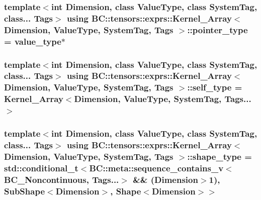 \subsubsection[{\texorpdfstring{pointer\+\_\+type}{pointer_type}}]{\setlength{\rightskip}{0pt plus 5cm}template$<$int Dimension, class Value\+Type, class System\+Tag, class... Tags$>$ using {\bf B\+C\+::tensors\+::exprs\+::\+Kernel\+\_\+\+Array}$<$ Dimension, Value\+Type, System\+Tag, Tags $>$\+::{\bf pointer\+\_\+type} =  {\bf value\+\_\+type}$\ast$}\hypertarget{structBC_1_1tensors_1_1exprs_1_1Kernel__Array_a63f8901ef5aa43d1aaa33698e5b2bcce}{}\label{structBC_1_1tensors_1_1exprs_1_1Kernel__Array_a63f8901ef5aa43d1aaa33698e5b2bcce}
\subsubsection[{\texorpdfstring{self\+\_\+type}{self_type}}]{\setlength{\rightskip}{0pt plus 5cm}template$<$int Dimension, class Value\+Type, class System\+Tag, class... Tags$>$ using {\bf B\+C\+::tensors\+::exprs\+::\+Kernel\+\_\+\+Array}$<$ Dimension, Value\+Type, System\+Tag, Tags $>$\+::{\bf self\+\_\+type} =  {\bf Kernel\+\_\+\+Array}$<$Dimension, Value\+Type, System\+Tag, Tags...$>$}\hypertarget{structBC_1_1tensors_1_1exprs_1_1Kernel__Array_a48e3325a79c498c34a6825c628a6f401}{}\label{structBC_1_1tensors_1_1exprs_1_1Kernel__Array_a48e3325a79c498c34a6825c628a6f401}
\subsubsection[{\texorpdfstring{shape\+\_\+type}{shape_type}}]{\setlength{\rightskip}{0pt plus 5cm}template$<$int Dimension, class Value\+Type, class System\+Tag, class... Tags$>$ using {\bf B\+C\+::tensors\+::exprs\+::\+Kernel\+\_\+\+Array}$<$ Dimension, Value\+Type, System\+Tag, Tags $>$\+::{\bf shape\+\_\+type} =  std\+::conditional\+\_\+t$<$B\+C\+::meta\+::sequence\+\_\+contains\+\_\+v$<${\bf B\+C\+\_\+\+Noncontinuous}, Tags...$>$ \&\& (Dimension$>$1), {\bf Sub\+Shape}$<$Dimension$>$, {\bf Shape}$<$Dimension$>$$>$}\hypertarget{structBC_1_1tensors_1_1exprs_1_1Kernel__Array_a9f2f703576ae567dcaf5e199bc3ef0f6}{}\label{structBC_1_1tensors_1_1exprs_1_1Kernel__Array_a9f2f703576ae567dcaf5e199bc3ef0f6}
